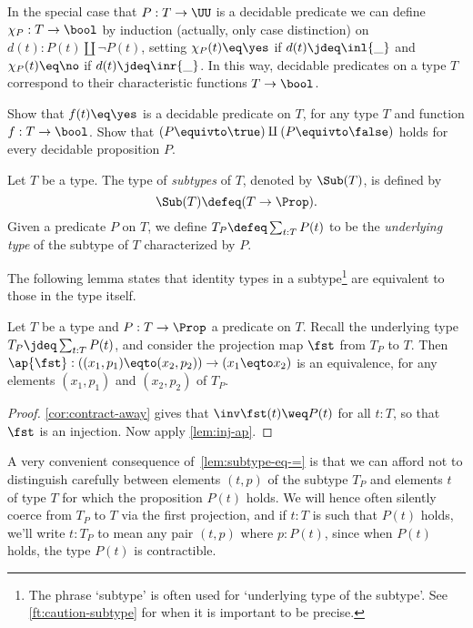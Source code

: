 In the special case that $P: T\to\UU$ is a decidable predicate
we can define $\chi_P: T\to\bool$ by induction (actually, only case distinction)
on $d(t) :P(t)\amalg\neg P(t)$, setting $\chi_P(t) \eq \yes$
if $d(t)\jdeq\inl{\_}$ and $\chi_P(t) \eq \no$ if $d(t)\jdeq\inr{\_}$.
In this way, decidable predicates on a type $T$ correspond to
their characteristic functions $T\to\bool$.

\begin{xca}\label{xca:decidability}
Show that $f(t) \eq \yes$ is a decidable predicate on $T$,
for any type $T$ and function $f:T\to\bool$.
Show that $(P\equivto\true)\amalg(P\equivto\false)$ holds
for every decidable proposition $P$.
\end{xca}

\begin{definition}\label{def:subtype}
  Let $T$ be a type.
  The type of \emph{subtypes} of $T$,
  denoted by $\Sub(T)$, is defined by
  \[
  \Sub(T) \defeq (T\to\Prop).
  \]
  Given a predicate $P$ on $T$, we define $T_P\defeq \sum_{t:T} P(t)$
  to be the \emph{underlying type} of the subtype of $T$ characterized by $P$.
  \end{definition}

The following lemma states that identity types in a subtype\footnote{%
The phrase `subtype' is often used for `underlying type of the subtype'.
See \cref{ft:caution-subtype} for when it is important
to be precise.}
are equivalent to those in the type itself.

\begin{lemma}\label{lem:subtype-eq-=}
  Let $T$ be a type and $P: T\to\Prop$ a predicate on $T$.
  Recall the underlying type $T_P \jdeq \sum_{t:T}P(t)$, and
  consider the projection map $\fst$ from $T_P$ to $T$.
  Then $\ap{\fst}: ((x_1,p_1) \eqto (x_2,p_2)) \to (x_1 \eqto x_2)$ is an
  equivalence, for any elements $(x_1,p_1)$ and $(x_2,p_2)$ of $T_P$.
\end{lemma}

\begin{proof}
\cref{cor:contract-away} gives that $\inv\fst(t)\weq P(t)$ for all $t:T$,
so that $\fst$ is an injection. Now apply \cref{lem:inj-ap}. 
\end{proof}

\begin{remark}\label{rem:subtype-convention}
  A very convenient consequence of~\cref{lem:subtype-eq-=}
  is that we can afford not to distinguish carefully
  between elements $(t,p)$ of the subtype $T_P$
  and elements $t$ of type $T$ for which the proposition $P(t)$ holds.
  We will hence often silently coerce from $T_P$ to $T$ via the first projection,
  and if $t:T$ is such that $P(t)$ holds, we'll write $t:T_P$
  to mean any pair $(t,p)$ where $p:P(t)$,
  since when $P(t)$ holds, the type $P(t)$ is contractible.
\end{remark}

